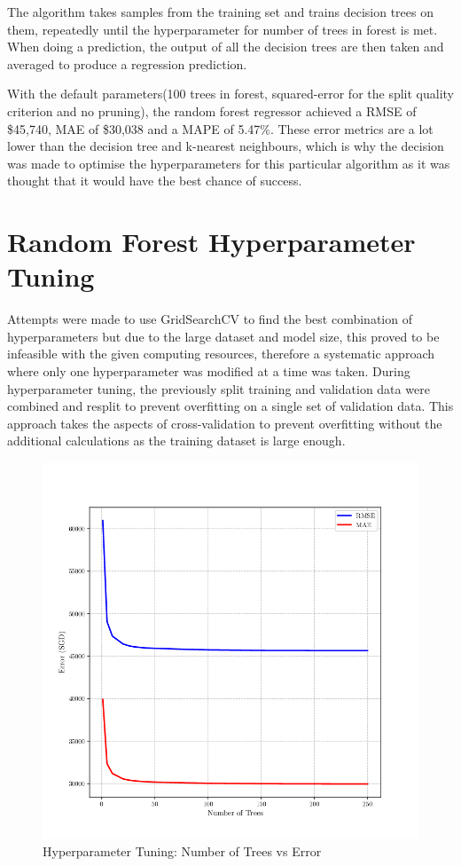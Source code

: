 \documentclass[[12pt,conference]{IEEEtran}
\begin{document}
The algorithm takes samples from the training set and trains decision trees on them, repeatedly until the hyperparameter for number of trees in forest is met.
When doing a prediction, the output of all the decision trees are then taken and averaged to produce a regression prediction.

With the default parameters(100 trees in forest, squared-error for the split quality criterion and no pruning), the random forest regressor achieved a RMSE of \$45,740, MAE of \$30,038 and a MAPE of 5.47\%. 
These error metrics are a lot lower than the decision tree and k-nearest neighbours, which is why the decision was made to optimise the hyperparameters for this particular algorithm as it was thought that it would have the best chance of success. 

\section{Random Forest Hyperparameter Tuning}
Attempts were made to use GridSearchCV to find the best combination of hyperparameters but due to the large dataset and model size, this proved to be infeasible with the given computing resources, therefore a systematic approach where only one hyperparameter was modified at a time was taken.
During hyperparameter tuning, the previously split training and validation data were combined and resplit to prevent overfitting on a single set of validation data. 
This approach takes the aspects of cross-validation to prevent overfitting without the additional calculations as the training dataset is large enough. 

\vspace{-1em}

\begin{figure}[H]
    \centering
    \includegraphics[width=0.85\linewidth]{4_random_forest_hyperparameter_tuning.png}
    \caption{Hyperparameter Tuning: Number of Trees vs Error}
    \label{fig:number-of-trees}
\end{figure}
\end{document}
